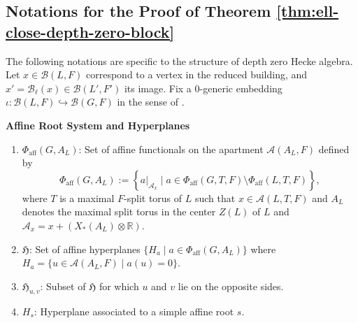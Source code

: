 \documentclass[american]{article}
\numberwithin{equation}{section}
\numberwithin{figure}{section}
\theoremstyle{plain}
\theoremstyle{definition}
\theoremstyle{remark}
\begin{document}
\subsection*{Notations for the Proof of Theorem \ref{thm:ell-close-depth-zero-block}}

The following notations are specific to the structure of depth zero Hecke algebra.
Let  $x \in \mathcal{B}(L,F)$ correspond to a vertex in the reduced building, and $x' = \mathscr{B}_\ell(x) \in \mathcal{B}(L',F')$ its image. Fix a \(0\)-generic embedding \(\iota:\mathcal{B}(L,F)\hookrightarrow \mathcal{B}(G,F)\) in the sense of \cite{KimYu2018}.
\vspace{1em}

\noindent \textbf{Affine Root System and Hyperplanes}
\begin{enumerate}
\item 
\(\Phi_{\mathrm{aff}}(G, A_L)\): Set of affine functionals on the apartment \(\mathcal{A}(A_L, F)\) defined by
\[
\Phi_{\mathrm{aff}}(G, A_L) := \left\{ a|_{\mathcal{A}_{x}} \mid a \in \Phi_{\mathrm{aff}}(G, T, F) \setminus \Phi_{\mathrm{aff}}(L, T, F) \right\},
\]
where \(T\) is a maximal \(F\)-split torus of \(L\) such that \(x \in \mathcal{A}(L, T, F)\) and \(A_L\) denotes the maximal split torus in the center \(Z(L)\) of \(L\) and \(\mathcal{A}_{x}=x+(X_*(A_L)\otimes \mathbb{R})\).
 
  \item \( \mathfrak{H} \): Set of affine hyperplanes \( \{H_a \mid a \in \Phi_{\mathrm{aff}}(G, A_L)\} \) where \( H_a = \{u \in \mathcal{A}(A_L, F) \mid a(u) = 0\} \).
  \item \( \mathfrak{H}_{u,v} \): Subset of \( \mathfrak{H} \) for which \( u \) and \( v \) lie on the opposite sides. 
  \item \( H_s \): Hyperplane associated to a simple affine root \( s \).
\end{enumerate}
\end{document}
